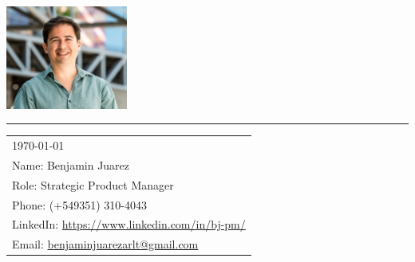 
\includegraphics[width=0.3\textwidth]{pic.png} %

\vspace{-1em} %

\rule{\linewidth}{1pt} %

\bigskip\bigskip %


\hfill
\begin{tabular}{l @{}}
	\today \midskip\\ %
	Name: Benjamin Juarez \\
	Role: Strategic Product Manager \\
	Phone: (+549351) 310-4043 \\
	LinkedIn: \href{https://www.linkedin.com/in/bj-pm/?locale=en_US}{https://www.linkedin.com/in/bj-pm/} \\
	Email: \href{benjaminjuarezarlt@gmail.com}{benjaminjuarezarlt@gmail.com} \\
\end{tabular}

\midskip 

